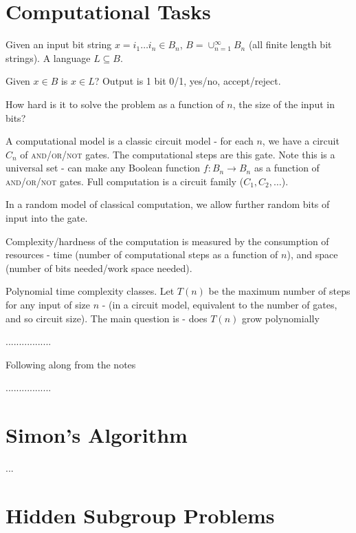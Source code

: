 \section{Computational Tasks}
\label{sec:computational-tasks}

Given an input bit string $x = i_{1} \dots i_{n} \in B_{n}$, $B =
\cup_{n=1}^{\infty} B_{n}$ (all finite length bit strings).  A
language $L \subseteq B$.

\begin{defn}
  \label{defn:fundamentals:1}
  Given $x \in B$ is $x \in L$?  Output is 1 bit 0/1, yes/no, accept/reject.
\end{defn}

\begin{question}
  How hard is it to solve the problem as a function of $n$, the size
  of the input in bits?
\end{question}
A computational model is a classic circuit model - for each $n$, we
have a circuit $C_{n}$ of \textsc{and}/\textsc{or}/\textsc{not} gates.
The computational steps are this gate. Note this is a universal set -
can make any Boolean function $f: B_{n} \rightarrow B_{n}$ as a
function of \textsc{and}/\textsc{or}/\textsc{not} gates.  Full
computation is a circuit family ($C_{1}, C_{2}, \dots$).

In a random model of classical computation, we allow further random
bits of input into the gate.

Complexity/hardness of the computation is measured by the consumption
of resources - time (number of computational steps as a function of
$n$), and space (number of bits needed/work space needed).

Polynomial time complexity classes.  Let $T(n)$ be the maximum number
of steps for any input of size $n$ - (in a circuit model, equivalent
to the number of gates, and so circuit size).  The main question is -
does $T(n)$ grow polynomially 


.................

Following along from the notes

.................


\section{Simon's Algorithm}
\label{sec:simons-algorithm}

...


\section{Hidden Subgroup Problems}
\label{sec:hidd-subgr-probl}

